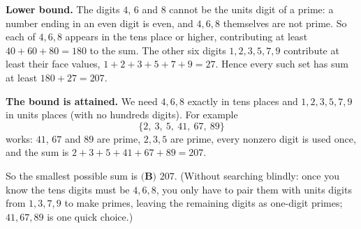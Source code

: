 \textbf{Lower bound.} The digits $4$, $6$ and $8$ cannot be the units digit of a prime: a number ending in an even digit is even, and $4,6,8$ themselves are not prime. So each of $4,6,8$ appears in the tens place or higher, contributing at least $40+60+80=180$ to the sum. The other six digits $1,2,3,5,7,9$ contribute at least their face values, $1+2+3+5+7+9=27$. Hence every such set has sum at least $180+27=207$.

\textbf{The bound is attained.} We need $4,6,8$ exactly in tens places and $1,2,3,5,7,9$ in units places (with no hundreds digits). For example
\[
\{2,\ 3,\ 5,\ 41,\ 67,\ 89\}
\]
works: $41$, $67$ and $89$ are prime, $2,3,5$ are prime, every nonzero digit is used once, and the sum is $2+3+5+41+67+89=207$.

So the smallest possible sum is $\boxed{\textbf{(B) }207}$. (Without searching blindly: once you know the tens digits must be $4,6,8$, you only have to pair them with units digits from $1,3,7,9$ to make primes, leaving the remaining digits as one-digit primes; $41,67,89$ is one quick choice.)
